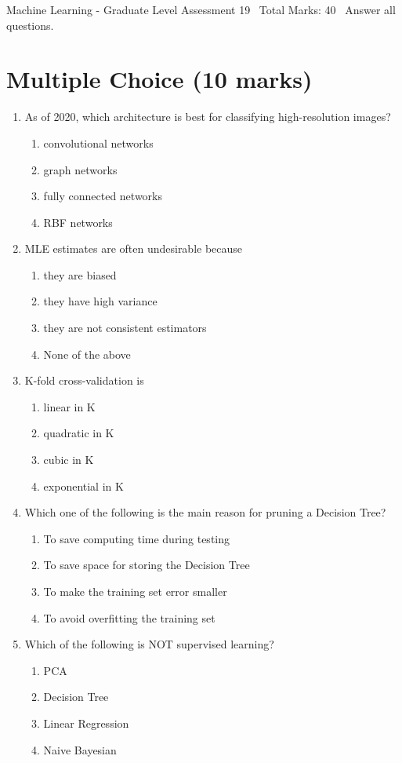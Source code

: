\documentclass[12pt]{article}
\begin{document}
\begin{center}
Machine Learning - Graduate Level Assessment 19 \
Total Marks: 40 \
Answer all questions.
\end{center}

\section*{Multiple Choice (10 marks)}
\begin{enumerate}[label=\arabic*.]
\item As of 2020, which architecture is best for classifying high-resolution images?
\begin{enumerate}[label=(\alph*)]
    \item convolutional networks
    \item graph networks
    \item fully connected networks
    \item RBF networks
\end{enumerate}
\item MLE estimates are often undesirable because
\begin{enumerate}[label=(\alph*)]
    \item they are biased
    \item they have high variance
    \item they are not consistent estimators
    \item None of the above
\end{enumerate}
\item K-fold cross-validation is
\begin{enumerate}[label=(\alph*)]
    \item linear in K
    \item quadratic in K
    \item cubic in K
    \item exponential in K
\end{enumerate}
\item Which one of the following is the main reason for pruning a Decision Tree?
\begin{enumerate}[label=(\alph*)]
    \item To save computing time during testing
    \item To save space for storing the Decision Tree
    \item To make the training set error smaller
    \item To avoid overfitting the training set
\end{enumerate}
\item Which of the following is NOT supervised learning?
\begin{enumerate}[label=(\alph*)]
    \item PCA
    \item Decision Tree
    \item Linear Regression
    \item Naive Bayesian
\end{enumerate}
\end{enumerate}
\end{document}
